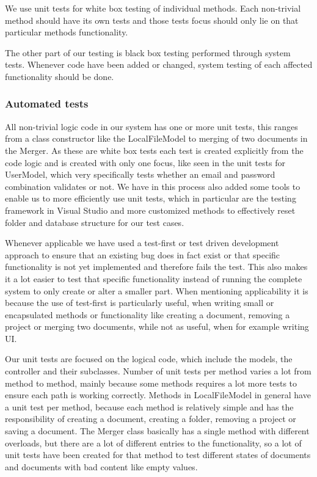 We use unit tests for white box testing of individual methods. Each non-trivial method should have its own tests and those tests focus should only lie on that particular methods functionality.

The other part of our testing is black box testing performed through system tests. Whenever code have been added or changed, system testing of each affected functionality should be done.

\subsubsection{Automated tests}
All non-trivial logic code in our system has one or more unit tests, this ranges from a class constructor like the LocalFileModel to merging of two documents in the Merger. As these are white box tests each test is created explicitly from the code logic and is created with only one focus, like seen in the unit tests for UserModel, which very specifically tests whether an email and password combination validates or not. We have in this process also added some tools to enable us to more efficiently use unit tests, which in particular are the testing framework in Visual Studio and more customized methods to effectively reset folder and database structure for our test cases.

Whenever applicable we have used a test-first or test driven development approach to ensure that an existing bug does in fact exist or that specific functionality is not yet implemented and therefore fails the test. This also makes it a lot easier to test that specific functionality instead of running the complete system to only create or alter a smaller part. When mentioning applicability it is because the use of test-first is particularly useful, when writing small  or encapsulated methods or functionality like creating a document, removing a project or merging two documents, while not as useful, when for example writing UI.

Our unit tests are focused on the logical code, which include the models, the controller and their subclasses. Number of unit tests per method varies a lot from method to method, mainly because some methods requires a lot more tests to ensure each path is working correctly. Methods in LocalFileModel in general have a unit test per method, because each method is relatively simple and has the responsibility of creating a document, creating a folder, removing a project or saving a document. The Merger class basically has a single method with different overloads, but there are a lot of different entries to the functionality, so a lot of unit tests have been created for that method to test different states of documents and documents with bad content like empty values.

